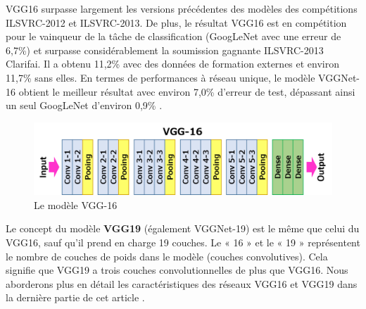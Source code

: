 	VGG16 surpasse largement les versions précédentes des modèles des compétitions ILSVRC-2012 et ILSVRC-2013. De plus, le résultat VGG16 est en compétition pour le vainqueur de la tâche de classification (GoogLeNet avec une erreur de 6,7\%) et surpasse considérablement la soumission gagnante ILSVRC-2013 Clarifai. Il a obtenu 11,2\% avec des données de formation externes et environ 11,7\% sans elles. En termes de performances à réseau unique, le modèle VGGNet-16 obtient le meilleur résultat avec environ 7,0\% d'erreur de test, dépassant ainsi un seul GoogLeNet d'environ 0,9\% \cite{simonyan2014very}.
	
	\begin{figure}[H]%
		\centering
		\includegraphics[width=\textwidth]{images/vgg16.png}
		\caption{Le modèle VGG-16 \cite{tammina2019transfer}}
		\label{fig:VGG16_model}
	\end{figure}

	Le concept du modèle \textbf{VGG19} (également VGGNet-19) est le même que celui du VGG16, sauf qu'il prend en charge 19 couches. Le « 16 » et le « 19 » représentent le nombre de couches de poids dans le modèle (couches convolutives). Cela signifie que VGG19 a trois couches convolutionnelles de plus que VGG16. Nous aborderons plus en détail les caractéristiques des réseaux VGG16 et VGG19 dans la dernière partie de cet article \cite{yu2016visualizing}.


	
	
	
	
	


